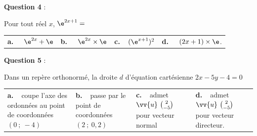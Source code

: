\medskip
\textbf{Question 4} :
\medskip 

Pour tout réel $x$, $\e^{2x+1}=$

\begin{center}
\begin{tabularx}{\linewidth}{*{4}{X}}
\textbf{a.~~} $\e^{2x} + \e $ &\textbf{b.~~} $\e^{2x} \times \e $&\textbf{c.~~}$(\e^{x+1})^2 $& \textbf{d.~~} $(2x+1)\times \e $.
\end{tabularx}
\end{center}

\medskip
\textbf{Question 5} :
\medskip 

Dans un repère orthonormé, la droite $d$ d'équation cartésienne $2x-5y-4=0$

\begin{center}
\begin{tabularx}{\linewidth}{*{4}{X}}
\textbf{a.~~}coupe l'axe des ordonnées au point de coordonnées $(0~;~-4)$ &\textbf{b.~~}passe par le point de coordonnées $(2~;~0,2)$&\textbf{c.~~}admet  $\vv{u}\ \binom{2}{-5}$ pour vecteur normal& \textbf{d.~~}admet $\vv{u}\ \binom{2}{-5}$   pour vecteur directeur.
\end{tabularx}
\end{center}


\vspace{1cm}
